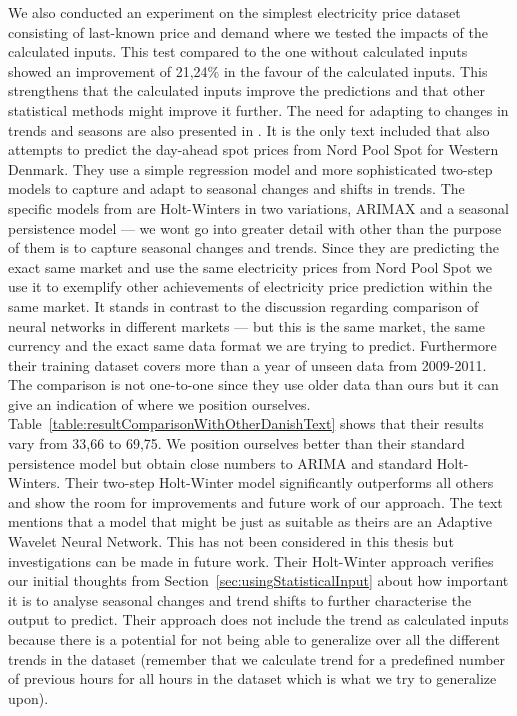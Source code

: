 We also conducted an experiment on the simplest electricity price dataset consisting of last-known price and demand where we tested the impacts of the calculated inputs. This test compared to the one without calculated inputs showed an improvement of 21,24\% in the favour of the calculated inputs. This strengthens that the calculated inputs improve the predictions and that other statistical methods might improve it further. The need for adapting to changes in trends and seasons are also presented in \cite{forecastingSpotPricesAccountingForWindPower}. It is the only text included that also attempts to predict the day-ahead spot prices from Nord Pool Spot for Western Denmark. They use a simple regression model and more sophisticated two-step models to capture and adapt to seasonal changes and shifts in trends. The specific models from \cite{forecastingSpotPricesAccountingForWindPower} are Holt-Winters in two variations, ARIMAX and a seasonal persistence model --- we wont go into greater detail with other than the purpose of them is to capture seasonal changes and trends. Since they are predicting the exact same market and use the same electricity prices from Nord Pool Spot we use it to exemplify other achievements of electricity price prediction within the same market. It stands in contrast to the discussion regarding comparison of neural networks in different markets --- but this is the same market, the same currency and the exact same data format we are trying to predict. Furthermore their training dataset covers more than a year of unseen data from 2009-2011. The comparison is not one-to-one since they use older data than ours but it can give an indication of where we position ourselves. Table~\ref{table:resultComparisonWithOtherDanishText} shows that their results vary from 33,66 to 69,75. We position ourselves better than their standard persistence model but obtain close numbers to ARIMA and standard Holt-Winters. Their two-step Holt-Winter model significantly outperforms all others and show the room for improvements and future work of our approach. The text mentions that a model that might be just as suitable as theirs are an Adaptive Wavelet Neural Network. This has not been considered in this thesis but investigations can be made in future work. Their Holt-Winter approach verifies our initial thoughts from Section~\ref{sec:usingStatisticalInput} about how important it is to analyse seasonal changes and trend shifts to further characterise the output to predict. Their approach does not include the trend as calculated inputs because there is a potential for not being able to generalize over all the different trends in the dataset (remember that we calculate trend for a predefined number of previous hours for all hours in the dataset which is what we try to generalize upon). 

